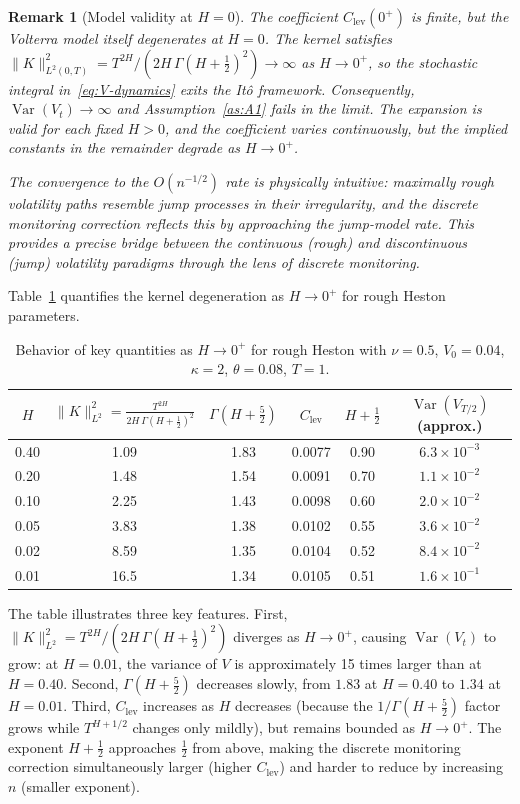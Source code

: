 \documentclass[12pt]{article}
\newtheorem{remark}{Remark}
\theoremstyle{definition}
\DeclareMathOperator{\Var}{Var}
\begin{document}
\begin{remark}[Model validity at $H = 0$]
The coefficient $C_{\mathrm{lev}}(0^+)$ is finite, but the Volterra
model itself degenerates at $H = 0$.
The kernel satisfies
$\|K\|_{L^2(0,T)}^2 = T^{2H}/(2H\,\Gamma(H+\tfrac12)^2) \to \infty$ as $H \to 0^+$,
so the stochastic integral in~\eqref{eq:V-dynamics} exits the
It\^o framework.
Consequently, $\Var(V_t) \to \infty$ and
Assumption~\ref{as:A1} fails in the limit.
The expansion is valid for each fixed $H > 0$, and the coefficient
varies continuously, but the implied constants in the remainder
degrade as $H \to 0^+$.

The convergence to the $O(n^{-1/2})$ rate is physically intuitive:
maximally rough volatility paths resemble jump processes in their
irregularity, and the discrete monitoring correction reflects this
by approaching the jump-model rate.
This provides a precise bridge between the continuous (rough) and
discontinuous (jump) volatility paradigms through the lens of
discrete monitoring.
\end{remark}

Table~\ref{tab:H-degeneration} quantifies the kernel degeneration
as $H \to 0^+$ for rough Heston parameters.

\begin{table}[htbp]
\centering
\caption{Behavior of key quantities as $H \to 0^+$ for rough Heston
with $\nu = 0.5$, $V_0 = 0.04$, $\kappa = 2$, $\theta = 0.08$, $T = 1$.}
\label{tab:H-degeneration}
\begin{tabular}{cccccc}
\toprule
$H$ & $\|K\|_{L^2}^2 = \frac{T^{2H}}{2H\,\Gamma(H+\frac12)^2}$
& $\Gamma(H+\tfrac52)$
& $C_{\mathrm{lev}}$
& $H{+}\tfrac12$
& $\Var(V_{T/2})$ (approx.) \\
\midrule
0.40 & 1.09 & 1.83 & 0.0077 & 0.90 & $6.3\times10^{-3}$ \\
0.20 & 1.48 & 1.54 & 0.0091 & 0.70 & $1.1\times10^{-2}$ \\
0.10 & 2.25 & 1.43 & 0.0098 & 0.60 & $2.0\times10^{-2}$ \\
0.05 & 3.83 & 1.38 & 0.0102 & 0.55 & $3.6\times10^{-2}$ \\
0.02 & 8.59 & 1.35 & 0.0104 & 0.52 & $8.4\times10^{-2}$ \\
0.01 & 16.5 & 1.34 & 0.0105 & 0.51 & $1.6\times10^{-1}$ \\
\bottomrule
\end{tabular}
\end{table}

The table illustrates three key features.
First, $\|K\|_{L^2}^2 = T^{2H}/(2H\,\Gamma(H+\tfrac12)^2)$ diverges as $H\to 0^+$,
causing $\Var(V_t)$ to grow: at $H = 0.01$, the variance of $V$
is approximately 15 times larger than at $H = 0.40$.
Second, $\Gamma(H+\tfrac52)$ decreases slowly, from $1.83$ at
$H = 0.40$ to $1.34$ at $H = 0.01$.
Third, $C_{\mathrm{lev}}$ increases as $H$ decreases (because
the $1/\Gamma(H+\tfrac52)$ factor grows while $T^{H+1/2}$ changes
only mildly), but remains bounded as $H \to 0^+$.
The exponent $H + \tfrac12$ approaches $\tfrac12$ from above,
making the discrete monitoring correction simultaneously larger
(higher $C_{\mathrm{lev}}$) and harder to reduce by increasing $n$
(smaller exponent).
\end{document}
